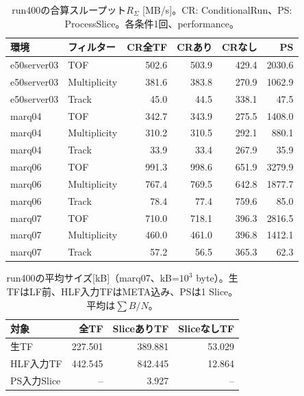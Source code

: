 \begin{table}[H]\centering\small
\caption{run400の合算スループット$R_\Sigma$ [MB/s]。CR: ConditionalRun、PS: ProcessSlice。各条件1回、performance。}
\begin{tabular}{llrrrr}\hline
環境 & フィルター & CR全TF & CRあり & CRなし & PS \\\hline
e50server03 & TOF & 502.6 & 503.9 & 429.4 & 2030.6 \\
e50server03 & Multiplicity & 381.6 & 383.8 & 270.9 & 1062.9 \\
e50server03 & Track & 45.0 & 44.5 & 338.1 & 47.5 \\
marq04 & TOF & 342.7 & 343.9 & 275.5 & 1408.0 \\
marq04 & Multiplicity & 310.2 & 310.5 & 292.1 & 880.1 \\
marq04 & Track & 33.9 & 33.4 & 267.9 & 35.9 \\
marq06 & TOF & 991.3 & 998.6 & 651.9 & 3279.9 \\
marq06 & Multiplicity & 767.4 & 769.5 & 642.8 & 1877.7 \\
marq06 & Track & 78.4 & 77.4 & 759.6 & 85.0 \\
marq07 & TOF & 710.0 & 718.1 & 396.3 & 2816.5 \\
marq07 & Multiplicity & 460.0 & 461.0 & 396.8 & 1412.1 \\
marq07 & Track & 57.2 & 56.5 & 365.3 & 62.3 \\
\hline\end{tabular}\end{table}
\begin{table}[H]\centering\small
\caption{run400の平均サイズ[kB]（marq07、kB=$10^3$ byte）。生TFはLF前、HLF入力TFはMETA込み、PSは1 Slice。平均は$\sum B/N$。}
\begin{tabular}{lrrr}\hline 対象 & 全TF & SliceありTF & SliceなしTF \\\hline
生TF & 227.501 & 389.881 & 53.029 \\
HLF入力TF & 442.545 & 842.445 & 12.864 \\
PS入力Slice & -- & 3.927 & -- \\
\hline\end{tabular}\end{table}
